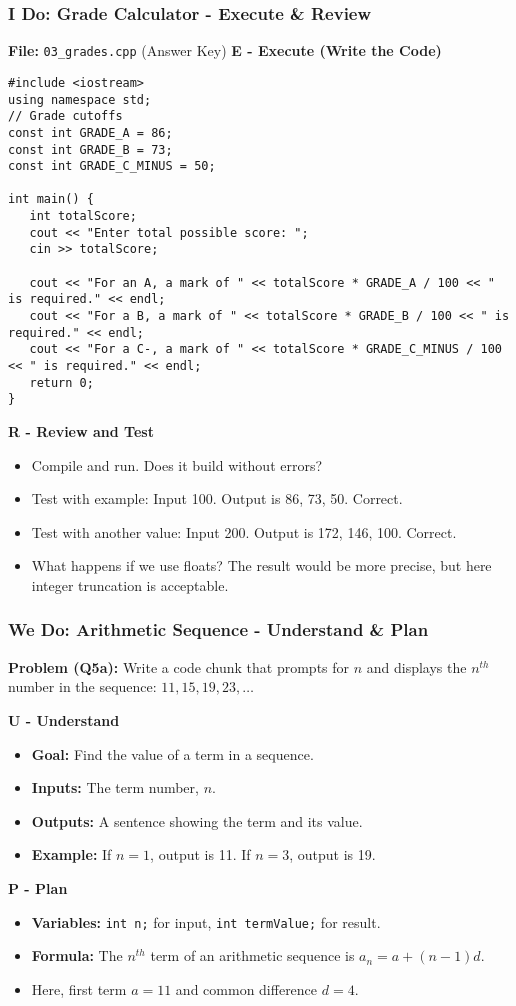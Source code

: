 \documentclass{beamer}
\begin{document}
\begin{frame}[fragile]
\frametitle{I Do: Grade Calculator - Execute \& Review}
\textbf{File:} \texttt{03\_grades.cpp} (Answer Key)
\vspace{1em}
\textbf{E - Execute (Write the Code)}
\begin{verbatim}
#include <iostream>
using namespace std;
// Grade cutoffs
const int GRADE_A = 86;
const int GRADE_B = 73;
const int GRADE_C_MINUS = 50;

int main() {
   int totalScore;
   cout << "Enter total possible score: ";
   cin >> totalScore;

   cout << "For an A, a mark of " << totalScore * GRADE_A / 100 << " is required." << endl;
   cout << "For a B, a mark of " << totalScore * GRADE_B / 100 << " is required." << endl;
   cout << "For a C-, a mark of " << totalScore * GRADE_C_MINUS / 100 << " is required." << endl;
   return 0;
}
\end{verbatim}
\pause
\textbf{R - Review and Test}
\begin{itemize}
    \item Compile and run. Does it build without errors?
    \item Test with example: Input 100. Output is 86, 73, 50. Correct.
    \item Test with another value: Input 200. Output is 172, 146, 100. Correct.
    \item What happens if we use floats? The result would be more precise, but here integer truncation is acceptable.
\end{itemize}
\end{frame}

\begin{frame}
\frametitle{We Do: Arithmetic Sequence - Understand \& Plan}
\textbf{Problem (Q5a):} Write a code chunk that prompts for $n$ and displays the $n^{th}$ number in the sequence: $11, 15, 19, 23, \dots$

\vspace{1em}
\textbf{U - Understand}
\begin{itemize}
    \item \textbf{Goal:} Find the value of a term in a sequence.
    \item \textbf{Inputs:} The term number, $n$.
    \item \textbf{Outputs:} A sentence showing the term and its value.
    \item \textbf{Example:} If $n=1$, output is 11. If $n=3$, output is 19.
\end{itemize}
\pause
\textbf{P - Plan}
\begin{itemize}
    \item \textbf{Variables:} \texttt{int n;} for input, \texttt{int termValue;} for result.
    \item \textbf{Formula:} The $n^{th}$ term of an arithmetic sequence is $a_n = a + (n-1)d$.
    \item Here, first term $a=11$ and common difference $d=4$.
\end{itemize}
\end{frame}
\end{document}

